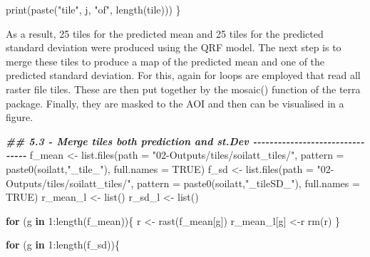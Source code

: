 \documentclass[
  10pt,
  b5paper,
  oneside]{book}
\newenvironment{Shaded}{\begin{snugshade}}{\end{snugshade}}
\newcommand{\AttributeTok}[1]{\textcolor[rgb]{0.77,0.63,0.00}{#1}}
\newcommand{\ConstantTok}[1]{\textcolor[rgb]{0.00,0.00,0.00}{#1}}
\newcommand{\ControlFlowTok}[1]{\textcolor[rgb]{0.13,0.29,0.53}{\textbf{#1}}}
\newcommand{\DecValTok}[1]{\textcolor[rgb]{0.00,0.00,0.81}{#1}}
\newcommand{\DocumentationTok}[1]{\textcolor[rgb]{0.56,0.35,0.01}{\textbf{\textit{#1}}}}
\newcommand{\FunctionTok}[1]{\textcolor[rgb]{0.00,0.00,0.00}{#1}}
\newcommand{\NormalTok}[1]{#1}
\newcommand{\OtherTok}[1]{\textcolor[rgb]{0.56,0.35,0.01}{#1}}
\newcommand{\SpecialCharTok}[1]{\textcolor[rgb]{0.00,0.00,0.00}{#1}}
\newcommand{\StringTok}[1]{\textcolor[rgb]{0.31,0.60,0.02}{#1}}
\begin{document}
\begin{Shaded}
\begin{Highlighting}[]
    \FunctionTok{print}\NormalTok{(}\FunctionTok{paste}\NormalTok{(}\StringTok{"tile"}\NormalTok{, j, }\StringTok{"of"}\NormalTok{, }\FunctionTok{length}\NormalTok{(tile)))}
\NormalTok{  \}}
\end{Highlighting}
\end{Shaded}

As a result, 25 tiles for the predicted mean and 25 tiles for the predicted standard deviation were produced using the QRF model. The next step is to merge these tiles to produce a map of the predicted mean and one of the predicted standard deviation. For this, again for loops are employed that read all raster file tiles. These are then put together by the mosaic() function of the terra package. Finally, they are masked to the AOI and then can be visualised in a figure.

\begin{Shaded}
\begin{Highlighting}[]
  \DocumentationTok{\#\# 5.3 {-} Merge tiles both prediction and st.Dev {-}{-}{-}{-}{-}{-}{-}{-}{-}{-}{-}{-}{-}{-}{-}{-}{-}{-}{-}{-}{-}{-}{-}{-}{-}{-}{-}{-}{-}{-}{-}{-}}
\NormalTok{  f\_mean }\OtherTok{\textless{}{-}} \FunctionTok{list.files}\NormalTok{(}\AttributeTok{path =} \StringTok{"02{-}Outputs/tiles/soilatt\_tiles/"}\NormalTok{, }
                       \AttributeTok{pattern =} \FunctionTok{paste0}\NormalTok{(soilatt,}\StringTok{"\_tile\_"}\NormalTok{), }\AttributeTok{full.names =} \ConstantTok{TRUE}\NormalTok{)}
\NormalTok{  f\_sd }\OtherTok{\textless{}{-}} \FunctionTok{list.files}\NormalTok{(}\AttributeTok{path =} \StringTok{"02{-}Outputs/tiles/soilatt\_tiles/"}\NormalTok{, }
                     \AttributeTok{pattern =}  \FunctionTok{paste0}\NormalTok{(soilatt,}\StringTok{"\_tileSD\_"}\NormalTok{), }\AttributeTok{full.names =} \ConstantTok{TRUE}\NormalTok{)}
\NormalTok{  r\_mean\_l }\OtherTok{\textless{}{-}} \FunctionTok{list}\NormalTok{()}
\NormalTok{  r\_sd\_l }\OtherTok{\textless{}{-}} \FunctionTok{list}\NormalTok{()}
  
  \ControlFlowTok{for}\NormalTok{ (g }\ControlFlowTok{in} \DecValTok{1}\SpecialCharTok{:}\FunctionTok{length}\NormalTok{(f\_mean))\{}
\NormalTok{    r }\OtherTok{\textless{}{-}} \FunctionTok{rast}\NormalTok{(f\_mean[g])}
\NormalTok{    r\_mean\_l[g] }\OtherTok{\textless{}{-}}\NormalTok{r}
    \FunctionTok{rm}\NormalTok{(r)}
\NormalTok{  \}}
  
  \ControlFlowTok{for}\NormalTok{ (g }\ControlFlowTok{in} \DecValTok{1}\SpecialCharTok{:}\FunctionTok{length}\NormalTok{(f\_sd))\{}
    

\end{Highlighting}
\end{Shaded}
\end{document}
